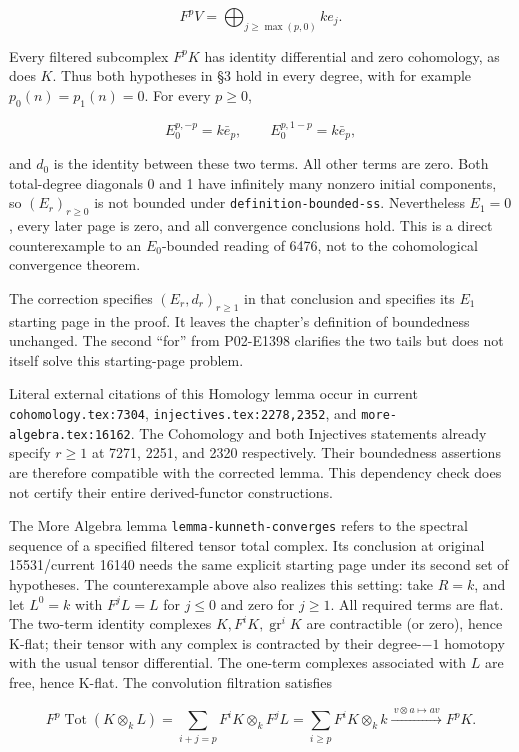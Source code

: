 \documentclass[11pt]{article}
\begin{document}
\[
F^pV=\bigoplus_{j\geq\max(p,0)}ke_j.
\]

Every filtered subcomplex \(F^pK\) has identity differential and zero cohomology, as does \(K\). Thus both hypotheses in §3 hold in every degree, with for example \(p_0(n)=p_1(n)=0\). For every \(p\geq0\),

\[
E_0^{p,-p}=k\bar e_p,\qquad
E_0^{p,1-p}=k\bar e_p,
\]

and \(d_0\) is the identity between these two terms. All other terms are zero. Both total-degree diagonals 0 and 1 have infinitely many nonzero initial components, so \((E_r)_{r\geq0}\) is not bounded under \texttt{definition-bounded-ss}. Nevertheless \(E_1=0\), every later page is zero, and all convergence conclusions hold. This is a direct counterexample to an \(E_0\)-bounded reading of 6476, not to the cohomological convergence theorem.

The correction specifies \((E_r,d_r)_{r\geq1}\) in that conclusion and specifies its \(E_1\) starting page in the proof. It leaves the chapter's definition of boundedness unchanged. The second ``for'' from P02-E1398 clarifies the two tails but does not itself solve this starting-page problem.

Literal external citations of this Homology lemma occur in current \texttt{cohomology.tex:7304}, \texttt{injectives.tex:2278,2352}, and \texttt{more-algebra.tex:16162}. The Cohomology and both Injectives statements already specify \(r\geq1\) at 7271, 2251, and 2320 respectively. Their boundedness assertions are therefore compatible with the corrected lemma. This dependency check does not certify their entire derived-functor constructions.

The More Algebra lemma \texttt{lemma-kunneth-converges} refers to the spectral sequence of a specified filtered tensor total complex. Its conclusion at original 15531/current 16140 needs the same explicit starting page under its second set of hypotheses. The counterexample above also realizes this setting: take \(R=k\), and let \(L^0=k\) with \(F^jL=L\) for \(j\leq0\) and zero for \(j\geq1\). All required terms are flat. The two-term identity complexes \(K,F^iK,\operatorname{gr}^iK\) are contractible (or zero), hence K-flat; their tensor with any complex is contracted by their degree-\(-1\) homotopy with the usual tensor differential. The one-term complexes associated with \(L\) are free, hence K-flat. The convolution filtration satisfies

\[
F^p\operatorname{Tot}(K\otimes_k L)
=\sum_{i+j=p}F^iK\otimes_k F^jL
=\sum_{i\geq p}F^iK\otimes_k k
\xrightarrow{\ v\otimes a\mapsto av\ }F^pK.
\]
\end{document}
